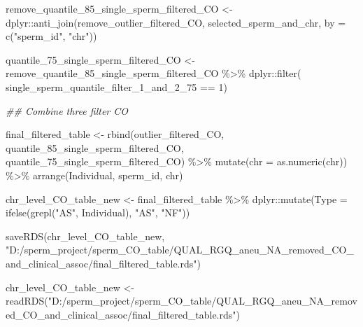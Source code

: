 \documentclass[
  letterpaper,
  DIV=11,
  numbers=noendperiod]{scrreprt}
\newenvironment{Shaded}{\begin{snugshade}}{\end{snugshade}}
\newcommand{\AttributeTok}[1]{\textcolor[rgb]{0.40,0.45,0.13}{#1}}
\newcommand{\DecValTok}[1]{\textcolor[rgb]{0.68,0.00,0.00}{#1}}
\newcommand{\DocumentationTok}[1]{\textcolor[rgb]{0.37,0.37,0.37}{\textit{#1}}}
\newcommand{\FunctionTok}[1]{\textcolor[rgb]{0.28,0.35,0.67}{#1}}
\newcommand{\NormalTok}[1]{\textcolor[rgb]{0.00,0.23,0.31}{#1}}
\newcommand{\OtherTok}[1]{\textcolor[rgb]{0.00,0.23,0.31}{#1}}
\newcommand{\SpecialCharTok}[1]{\textcolor[rgb]{0.37,0.37,0.37}{#1}}
\newcommand{\StringTok}[1]{\textcolor[rgb]{0.13,0.47,0.30}{#1}}
\begin{document}
\begin{codelisting}
\begin{Shaded}
\begin{Highlighting}[]
\NormalTok{remove\_quantile\_85\_single\_sperm\_filtered\_CO }\OtherTok{\textless{}{-}}\NormalTok{  dplyr}\SpecialCharTok{::}\FunctionTok{anti\_join}\NormalTok{(remove\_outlier\_filtered\_CO, selected\_sperm\_and\_chr, }\AttributeTok{by =} \FunctionTok{c}\NormalTok{(}\StringTok{"sperm\_id"}\NormalTok{, }\StringTok{"chr"}\NormalTok{))}

\NormalTok{quantile\_75\_single\_sperm\_filtered\_CO }\OtherTok{\textless{}{-}}\NormalTok{ remove\_quantile\_85\_single\_sperm\_filtered\_CO }\SpecialCharTok{\%\textgreater{}\%}\NormalTok{ dplyr}\SpecialCharTok{::}\FunctionTok{filter}\NormalTok{( single\_sperm\_quantile\_filter\_1\_and\_2\_75 }\SpecialCharTok{==} \DecValTok{1}\NormalTok{)}

\DocumentationTok{\#\# Combine three filter CO}

\NormalTok{final\_filtered\_table }\OtherTok{\textless{}{-}} \FunctionTok{rbind}\NormalTok{(outlier\_filtered\_CO, quantile\_85\_single\_sperm\_filtered\_CO, quantile\_75\_single\_sperm\_filtered\_CO) }\SpecialCharTok{\%\textgreater{}\%} \FunctionTok{mutate}\NormalTok{(}\AttributeTok{chr =} \FunctionTok{as.numeric}\NormalTok{(chr)) }\SpecialCharTok{\%\textgreater{}\%} \FunctionTok{arrange}\NormalTok{(Individual, sperm\_id, chr)}

\NormalTok{chr\_level\_CO\_table\_new }\OtherTok{\textless{}{-}}\NormalTok{ final\_filtered\_table }\SpecialCharTok{\%\textgreater{}\%}\NormalTok{ dplyr}\SpecialCharTok{::}\FunctionTok{mutate}\NormalTok{(}\AttributeTok{Type =} \FunctionTok{ifelse}\NormalTok{(}\FunctionTok{grepl}\NormalTok{(}\StringTok{"AS"}\NormalTok{, Individual), }\StringTok{"AS"}\NormalTok{, }\StringTok{"NF"}\NormalTok{))}

\FunctionTok{saveRDS}\NormalTok{(chr\_level\_CO\_table\_new, }\StringTok{"D:/sperm\_project/sperm\_CO\_table/QUAL\_RGQ\_aneu\_NA\_removed\_CO\_and\_clinical\_assoc/final\_filtered\_table.rds"}\NormalTok{)}

\NormalTok{chr\_level\_CO\_table\_new }\OtherTok{\textless{}{-}} \FunctionTok{readRDS}\NormalTok{(}\StringTok{"D:/sperm\_project/sperm\_CO\_table/QUAL\_RGQ\_aneu\_NA\_removed\_CO\_and\_clinical\_assoc/final\_filtered\_table.rds"}\NormalTok{)}
\end{Highlighting}
\end{Shaded}

\end{codelisting}
\end{document}

